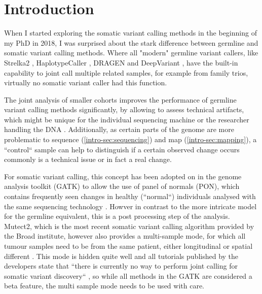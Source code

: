 \section{Introduction}
\label{variantcalling-sec:intro}

When I started exploring the somatic variant calling methods in the beginning of my PhD in 2018, I was surprised about the stark difference between germline and somatic variant calling methods. Where all "modern" germline variant callers, like Strelka2 \cite{Kim2018}, HaplotypeCaller \cite{Poplin2017}, DRAGEN \cite{Miller2015} and DeepVariant \cite{Poplin2018},  have the built-in capability to joint call multiple related samples, for example from family trios, virtually no somatic variant caller had this function. 

The joint analysis of smaller cohorts improves the performance of germline variant calling methods significantly, by allowing to assess technical artifacts, which might be unique for the individual sequencing machine or the researcher handling the DNA \cite{Schirmer2016,Stoler2021}. Additionally, as certain parts of the genome are more problematic to sequence (\autoref{intro-sec:sequencing}) and map (\autoref{intro-sec:mapping}), a ``control`` sample can help to distinguish if a certain observed change occurs commonly is a technical issue or in fact a real change.

For somatic variant calling, this concept has been adopted on in the genome analysis toolkit (GATK) \cite{BrianOConnor2020} to allow the use of panel of normals (PON), which contains frequently seen changes in healthy (``normal``) individuals analysed with the same sequencing technology \cite{GATKTeam2021}. Howver in contrast to the  more intricate model for the germline equivalent, this is a post processing step of the analysis. Mutect2, which is the most recent somatic variant calling algorithm provided by the Broad institute, however also provides a multi-sample mode, for which all tumour samples need to be from the same patient, either longitudinal or spatial different \cite{GATKTeam2020}. This mode is hidden quite well and all tutorials published by the developers state that ``there is currently no way to perform joint calling for somatic variant discovery`` \cite{GATKTeam2021a}, so while all methods in the GATK are considered a beta feature, the multi sample mode needs to be used with care.

